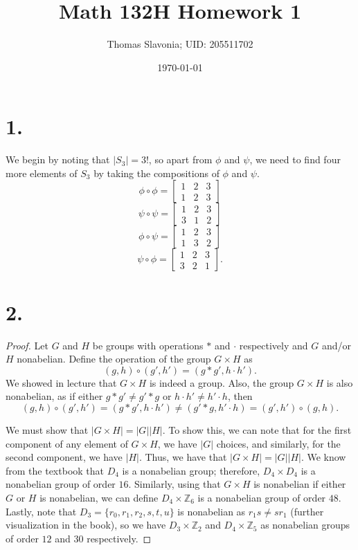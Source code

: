 \documentclass{article}
\title{Math 132H Homework 1}
\author{Thomas Slavonia; UID: 205511702}
\date{\today}
\begin{document}
\maketitle

\section*{1.}
We begin by noting that $|S_3| = 3!$, so apart from $\phi$ and $\psi$, we need to find four more elements of $S_3$ by taking the compositions of $\phi$ and $\psi$.
\[
  \phi \circ \phi = \begin{bmatrix}
    1 & 2 & 3 \\
    1 & 2 & 3
  \end{bmatrix}
  \]
\[
  \psi \circ \psi = \begin{bmatrix}
    1 & 2 & 3 \\
    3 & 1 & 2
  \end{bmatrix}
\]
\[
\phi \circ \psi = \begin{bmatrix}
  1 & 2 & 3 \\
  1 & 3 & 2
\end{bmatrix}  
\]
\[
\psi \circ \phi = \begin{bmatrix}
  1 & 2 & 3 \\
  3 & 2 & 1 
\end{bmatrix}.
\]

\section*{2.}
\begin{proof}
  Let $G$ and $H$ be groups with operations $*$ and $\cdot $ respectively and $G$ and/or $H$ nonabelian. Define the operation of the group $G \times H$ as \[(g, h) \circ (g', h') = (g * g', h \cdot h').\] 
  We showed in lecture that $G \times H$ is indeed a group. Also, the group $G \times H$ is also nonabelian, as if either $g*g' \neq g'*g$ or $h \cdot h' \neq h' \cdot h$, then 
  \[
    (g, h) \circ (g', h') = (g * g', h \cdot h') \neq (g' *g , h' \cdot h) = (g', h') \circ (g, h).
    \]

    We must show that $|G \times H| = |G||H|$. To show this, we can note that for the first component of any element of $G \times H$, we have $|G|$ choices, and similarly, for the second component, we have $|H|$. Thus, we have that $|G \times H| = |G||H|$. We know from the textbook that $D_4$ is a nonabelian group; therefore, $D_4 \times D_4$ is a nonabelian group of order $16$. Similarly, using that $G \times H$ is nonabelian if either $G$ or $H$ is nonabelian, we can define $D_4 \times \mathbb{Z}_6$ is a nonabelian group of order $48$. Lastly, note that $D_3 = \{r_0, r_1, r_2, s, t, u\}$ is nonabelian as $r_1 s \neq s r_1$ (further visualization in the book), so we have $D_3 \times \mathbb{Z}_2$ and $D_4 \times \mathbb{Z}_5$ as nonabelian groups of order $12$ and $30$ respectively. 

  
\end{proof}
\end{document}
